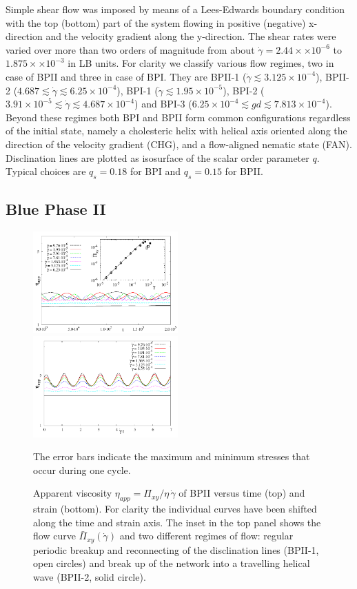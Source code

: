 \documentclass[aps,pre,reprint,superscriptaddress, twocolumn]{revtex4}
\newcommand{\e}[1]{\times10^{#1}}
\newcommand{\gd}{\dot{\gamma}}
\begin{document}
Simple shear flow was imposed by means of a Lees-Edwards boundary condition ~\cite{Wagner:2002} with
the top (bottom) part of the system flowing in positive (negative) x-direction and the 
velocity gradient along the y-direction.
The shear rates were varied over more than two orders of magnitude from about 
$\gd=2.44\times \e{-6}$ to $1.875\times\e{-3}$ in LB units.
For clarity we classify various flow regimes, two in case of BPII and three in case of BPI. 
They are BPII-1 ($\gd \lesssim 3.125\e{-4}$), BPII-2 ($4.687\lesssim \gd\lesssim 6.25\e{-4}$),
BPI-1 ($\gd \lesssim 1.95\e{-5}$), BPI-2 ($3.91\e{-5}\lesssim \gd \lesssim 4.687\e{-4}$) and BPI-3 ($6.25\e{-4}\lesssim gd\lesssim 7.813\e{-4}$).
Beyond these regimes both BPI and BPII form common configurations regardless 
of the initial state, namely a cholesteric helix with helical axis 
oriented along the direction of the velocity gradient (CHG), 
and a flow-aligned nematic state (FAN).  
Disclination lines are plotted as isosurface of the scalar order parameter $q$. 
Typical choices are $q_s=0.18$ for BPI and $q_s=0.15$ for BPII.


\subsection{Blue Phase II}

\begin{figure}[htpb]
\includegraphics[width=0.495\textwidth]{stress_bp2.pdf}
\includegraphics[width=0.495\textwidth]{stress_vs_strain_bp2.pdf}
\caption{Apparent viscosity $\eta_{app}=\Pi_{xy}/\eta\,\gd$ of BPII versus time (top) and strain (bottom). 
For clarity the individual curves have been shifted along the time and strain axis. 
The inset in the top panel 
shows the flow curve $\bar{\Pi}_{xy}(\gd)$ and two different regimes of flow: 
regular periodic breakup and reconnecting of the disclination lines (BPII-1, open circles) 
and break up of the network into a travelling helical wave (BPII-2, solid circle).}
The error bars indicate the maximum and minimum stresses that occur during one cycle.
\label{bp2-rheo}
\end{figure}
\end{document}

